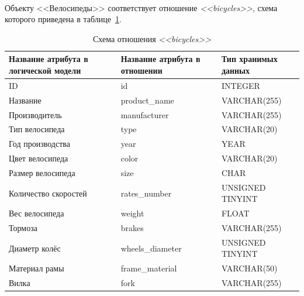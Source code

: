\paragraph{}
Объекту <<Велосипеды>> соответствует отношение \textit{<<bicycles>>}, схема которого приведена в
таблице~\ref{tbl:bicycles_scheme}.
\begin{table}[h!]
  \caption{Схема отношения \textit{<<bicycles>>}}
  \label{tbl:bicycles_scheme}
  \small{
    \centering
    \begin{tabular}{| p{} | p{} | p{} |}
      \hline
      Название атрибута в \newline логической модели &
      Название атрибута в \newline отношении &
      Тип хранимых данных \\

      \hline
      ID & id & INTEGER \\

      \hline
      Название & product\_name & VARCHAR(255) \\

      \hline
      Производитель & manufacturer & VARCHAR(255) \\

      \hline
      Тип велосипеда & type & VARCHAR(20) \\

      \hline
      Год производства & year & YEAR \\

      \hline
      Цвет велосипеда & color & VARCHAR(20) \\

      \hline
      Размер велосипеда & size & CHAR \\

      \hline
      Количество скоростей & rates\_number & UNSIGNED TINYINT \\

      \hline
      Вес велосипеда & weight & FLOAT \\

      \hline
      Тормоза & brakes & VARCHAR(255) \\

      \hline
      Диаметр колёс & wheels\_diameter & UNSIGNED TINYINT \\

      \hline
      Материал рамы & frame\_material & VARCHAR(50) \\

      \hline
      Вилка & fork & VARCHAR(255) \\


\end{tabular}}
\end{table}

